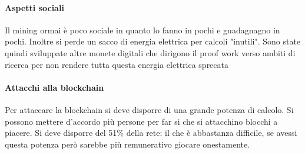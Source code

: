 \paragraph{Aspetti sociali} Il mining ormai è poco sociale in quanto lo fanno in pochi e guadagnagno in pochi.
Inoltre si perde un sacco di energia elettrica per calcoli "inutili".
Sono state quindi sviluppate altre monete digitali che dirigono il proof work verso ambiti di ricerca per non rendere tutta questa energia elettrica sprecata

\paragraph{Attacchi alla blockchain}
Per attaccare la blockchain si deve disporre di una grande potenza di calcolo. Si possono mettere d'accordo più persone per far si che si attacchino blocchi a piacere. Si deve disporre del 51\% della rete: il che è abbastanza difficile, se avessi questa potenza però sarebbe più remunerativo giocare onestamente.












